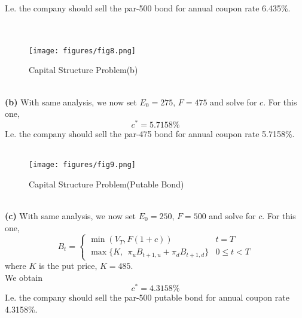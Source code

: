 \documentclass[10 pt]{hwtemplate} %
\begin{document}
\begin{solution}
I.e. the company should sell the par-500 bond for annual coupon rate 6.435\%.\\
~\\
~\\
\begin{figure}[H]
  \centering
  \captionsetup{justification=centering}
  \caption{\label{fig:q21pb}Capital Structure Problem(b)}
  \texttt{[image: figures/fig8.png]}
\end{figure}
~\\
\textbf{(b)} With same analysis, we now set $E_0 = 275$, $F=475$ and solve for $c$. For this one,
$$
c^* = 5.7158\%
$$
I.e. the company should sell the par-475 bond for annual coupon rate 5.7158\%.\\
~\\
\begin{figure}[H]
  \centering
  \captionsetup{justification=centering}
  \caption{\label{fig:q21pc}Capital Structure Problem(Putable Bond)}
  \texttt{[image: figures/fig9.png]}
\end{figure}
~\\
\textbf{(c)} With same analysis, we now set $E_0 = 250$, $F=500$ and solve for $c$. For this one,
$$
B_t = \begin{cases}\min(V_T, F(1+c)) & t=T\\
\max\{K, ~~\pi_u B_{t+1, u}+\pi_d B_{t+1, d}\} & 0\leq t< T
\end{cases}
$$
where $K$ is the put price, $K=485$.\\
We obtain
$$
c^* = 4.3158\%
$$
I.e. the company should sell the par-500 putable bond for annual coupon rate 4.3158\%.\\
\end{solution}
\end{document}

